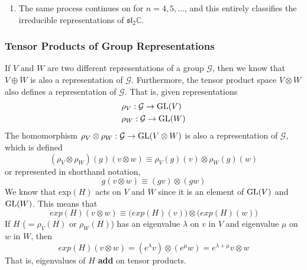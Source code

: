 \begin{enumerate}
    \item The same process continues on for $n=4, 5, ...$, and this entirely classifies the irreducible representations of $\mathfrak{sl}_2 \mathbb{C}$. 
  \end{enumerate} 

  \pagebreak

  \subsubsection{Tensor Products of Group Representations}

    \begin{definition}
      If $V$ and $W$ are two different representations of a group $\mathcal{G}$, then we know that $V \oplus W$ is also a representation of $\mathcal{G}$. Furthermore, the tensor product space $V \otimes W$ also defines a representation of $\mathcal{G}$. That is, given representations
      \begin{align*}
        & \rho_V: \mathcal{G} \rightarrow \GL(V) \\
        & \rho_W: \mathcal{G} \rightarrow \GL(W)
      \end{align*}
      The homomorphism $\rho_V \otimes \rho_W: \mathcal{G} \rightarrow \GL(V \otimes W)$ is also a representation of $\mathcal{G}$, which is defined
      \begin{equation}
        (\rho_V \otimes \rho_W)(g) (v \otimes w) \equiv \rho_V (g) (v) \otimes \rho_W (g) (w)
      \end{equation}
      or represented in shorthand notation, 
      \begin{equation}
        g(v \otimes w) \equiv (g v) \otimes (g w)
      \end{equation}
      We know that exp$(H)$ acts on $V$ and $W$ since it is an element of $\GL(V)$ and $\GL(W)$. This means that
      \begin{equation}
        exp(H)(v \otimes w) \equiv \big( exp(H)(v)\big) \otimes \big( exp(H)(w)\big)
      \end{equation}
      If $H$ ($= \rho_V (H)$ or $\rho_W(H)$) has an eigenvalue $\lambda$ on $v$ in $V$ and eigenvalue $\mu$ on $w$ in $W$, then 
      \begin{equation}
        exp(H) (v \otimes w) = (e^\lambda v) \otimes (e^\mu w) = e^{\lambda + \mu} v \otimes w
      \end{equation}
      That is, eigenvalues of $H$ \textbf{add} on tensor products. 
    \end{definition}

